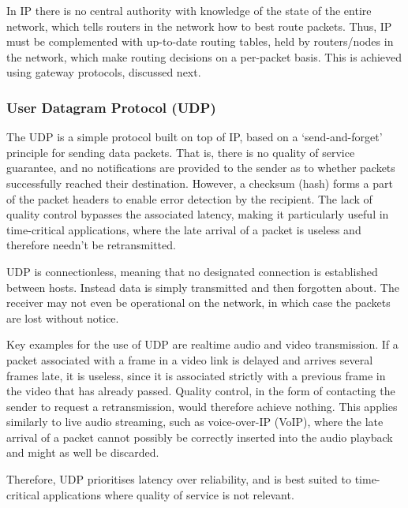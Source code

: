 \documentclass[aps, rmp, twocolumn, amsmath, amssymb, nofootinbib, superscriptaddress, longbibliography, floatfix, table-of-contents, eqsecnum]{revtex4-1}
\begin{document}
In IP there is no central authority with knowledge of the state of the entire network, which tells routers in the network how to best route packets. Thus, IP must be complemented with up-to-date routing tables, held by routers/nodes in the network, which make routing decisions on a per-packet basis. This is achieved using gateway protocols, discussed next.

%
%

\subsubsection{User Datagram Protocol (UDP)} 

The UDP is a simple protocol built on top of IP, based on a `send-and-forget' principle for sending data packets. That is, there is no quality of service guarantee, and no notifications are provided to the sender as to whether packets successfully reached their destination. However, a checksum (hash) forms a part of the packet headers to enable error detection by the recipient. The lack of quality control bypasses the associated latency, making it particularly useful in time-critical applications, where the late arrival of a packet is useless and therefore needn't be retransmitted.

UDP is connectionless, meaning that no designated connection is established between hosts. Instead data is simply transmitted and then forgotten about. The receiver may not even be operational on the network, in which case the packets are lost without notice.

Key examples for the use of UDP are realtime audio and video transmission. If a packet associated with a frame in a video link is delayed and arrives several frames late, it is useless, since it is associated strictly with a previous frame in the video that has already passed. Quality control, in the form of contacting the sender to request a retransmission, would therefore achieve nothing. This applies similarly to live audio streaming, such as voice-over-IP (VoIP), where the late arrival of a packet cannot possibly be correctly inserted into the audio playback and might as well be discarded.

Therefore, UDP prioritises latency over reliability, and is best suited to time-critical applications where quality of service is not relevant.

%
%
\end{document}
